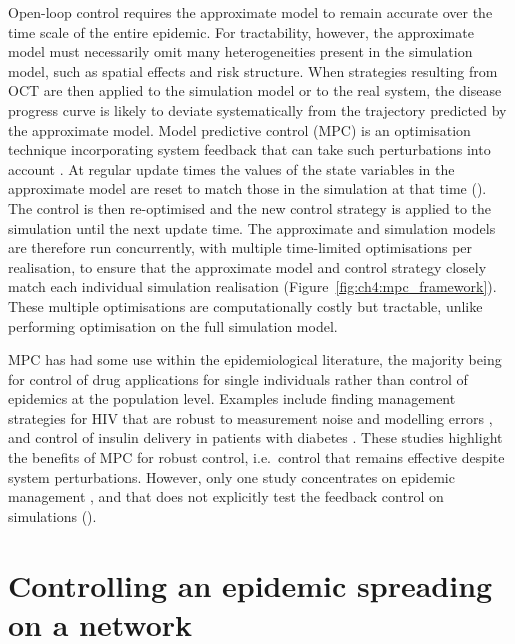 Open-loop control requires the approximate model to remain accurate over the time scale of the entire epidemic. For tractability, however, the approximate model must necessarily omit many heterogeneities present in the simulation model, such as spatial effects and risk structure. When strategies resulting from OCT are then applied to the simulation model or to the real system, the disease progress curve is likely to deviate systematically from the trajectory predicted by the approximate model. Model predictive control (MPC) is an optimisation technique incorporating system feedback that can take such perturbations into account \citep{camacho_model_2012, lee_model_2011}. At regular update times the values of the state variables in the approximate model are reset to match those in the simulation at that time (). The control is then re-optimised and the new control strategy is applied to the simulation until the next update time. The approximate and simulation models are therefore run concurrently, with multiple time-limited optimisations per realisation, to ensure that the approximate model and control strategy closely match each individual simulation realisation (Figure~\ref{fig:ch4:mpc_framework}). These multiple optimisations are computationally costly but tractable, unlike performing optimisation on the full simulation model.

MPC has had some use within the epidemiological literature, the majority being for control of drug applications for single individuals rather than control of epidemics at the population level. Examples include finding management strategies for HIV that are robust to measurement noise and modelling errors \citep{zurakowski_model_2006, david_receding_2011}, and control of insulin delivery in patients with diabetes \citep{hovorka_nonlinear_2004}. These studies highlight the benefits of MPC for robust control, i.e.\ control that remains effective despite system perturbations. However, only one study concentrates on epidemic management \citep{selley_dynamic_2015}, and that does not explicitly test the feedback control on simulations ().

\section{Controlling an epidemic spreading on a network\label{sec:ch4:Controlling}}

